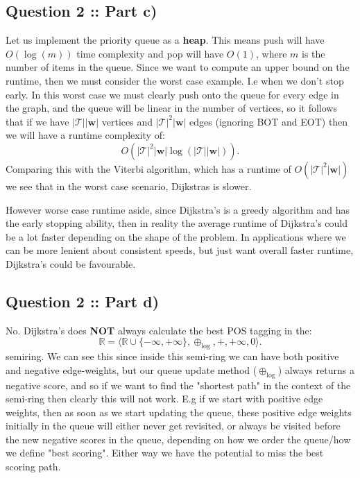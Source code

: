 \documentclass[a4paper]{article}
\begin{document}
\subsection*{Question 2 :: Part c)}
Let us implement the priority queue as a \textbf{heap}. This means
push will have $O(\log(m))$ time complexity and pop will have $O(1)$, where  $m$ is
the number of items in the queue. Since we want to compute an upper bound
on the runtime, then we must consider the worst case example. I.e when
we don't stop early. In this worst case we must clearly push onto the queue
for every edge in the graph, and the queue will be linear in the number of vertices,
so it follows that if we have  $| \mathcal{T} | | \bm{w} | $ vertices and $| \mathcal{T} |^2 | \bm{w} |$ edges (ignoring BOT and EOT)
then we will have a runtime complexity of:
\[
O(\left| \mathcal{T} \right| ^2 \left| \bm{w} \right| \log(\left| \mathcal{T} \right| \left| \bm{w} \right| ))
.\]
Comparing this with the Viterbi algorithm, which has a runtime 
of $O(\left| \mathcal{T} \right|^2 \left| \bm{w} \right| )$
we see that in the worst case scenario, Dijkstras is slower.

However worse case runtime aside, since Dijkstra's is a greedy algorithm
and has the early stopping ability, then in reality the average runtime of
Dijkstra's could be a lot faster depending on the shape of the problem.
In applications where we can be more lenient about consistent speeds, but just
want overall faster runtime, Dijkstra's could be favourable.

\subsection*{Question 2 :: Part d)}
No. Dijkstra's does \textbf{NOT} always calculate the best POS tagging in
the:
\[
\mathbb{R} = \langle \mathbb{R} \cup \{-\infty, +\infty\}, \oplus_{\log}, +, +\infty, 0  \rangle
.\]
semiring. We can see this since inside this semi-ring we can have both positive and negative
edge-weights, but our queue update method ($\oplus_{\log}$) always returns a negative
score, and so if we want to find the "shortest path" in the context of the semi-ring then
clearly this will not work. E.g if we start with positive edge weights, then as soon as we start updating the queue, these positive edge
weights initially in the queue will either never get revisited, or always be visited before
the new negative scores in the queue, depending on how we order the queue/how we define "best scoring".
Either way we have the potential to miss the best scoring path.
\end{document}
